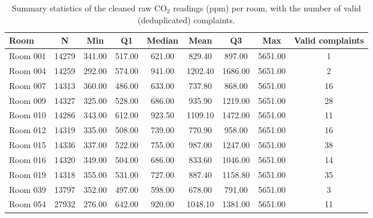 \begin{table}[ht]
\centering
\begin{adjustbox}{max width=\textwidth}
\begin{tabular}{lcccccccc}
\hline
Room & N & Min & Q1 & Median & Mean & Q3 & Max & Valid complaints \\
\hline
Room 001 & 14279 & 341.00 & 517.00 & 621.00 & 829.40 & 897.00 & 5651.00 & 1 \\
Room 004 & 14259 & 292.00 & 574.00 & 941.00 & 1202.40 & 1686.00 & 5651.00 & 2 \\
Room 007 & 14313 & 360.00 & 486.00 & 633.00 & 737.80 & 868.00 & 5651.00 & 16 \\
Room 009 & 14327 & 325.00 & 528.00 & 686.00 & 935.90 & 1219.00 & 5651.00 & 28 \\
Room 010 & 14286 & 343.00 & 612.00 & 923.50 & 1109.10 & 1472.00 & 5651.00 & 11 \\
Room 012 & 14319 & 335.00 & 508.00 & 739.00 & 770.90 & 958.00 & 5651.00 & 16 \\
Room 015 & 14336 & 337.00 & 522.00 & 755.00 & 987.00 & 1247.00 & 5651.00 & 38 \\
Room 016 & 14320 & 349.00 & 504.00 & 686.00 & 833.60 & 1046.00 & 5651.00 & 14 \\
Room 019 & 14318 & 355.00 & 531.00 & 727.00 & 887.40 & 1158.80 & 5651.00 & 35 \\
Room 039 & 13797 & 352.00 & 497.00 & 598.00 & 678.00 & 791.00 & 5651.00 & 3 \\
Room 054 & 27932 & 276.00 & 642.00 & 920.00 & 1048.10 & 1381.00 & 5651.00 & 11 \\
\hline
\end{tabular}
\end{adjustbox}
\caption{Summary statistics of the cleaned raw CO$_2$ readings (ppm) per room, with the number of valid (deduplicated) complaints.}
\label{tab:raw_co2_quantiles}
\end{table}
